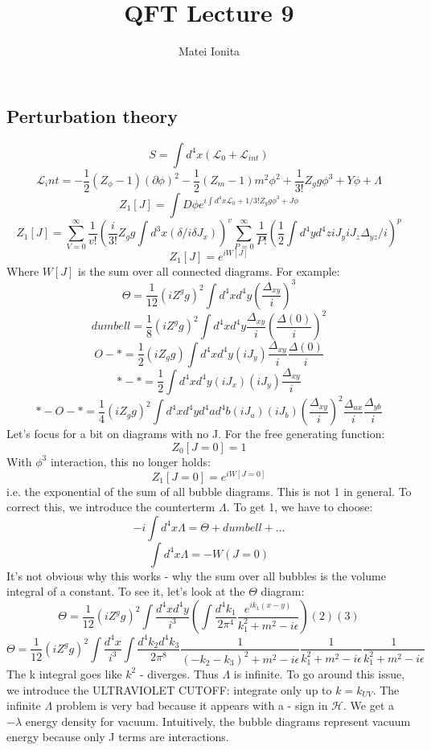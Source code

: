 \documentclass[12 pt]{article}
\title{QFT Lecture 9}
\author{Matei Ionita}
\begin{document}
  \maketitle

\subsection*{Perturbation theory}
\[  S = \int d^4 x (\mathcal{L}_0 + \mathcal{L}_{int} )  \]
\[  \mathcal{L}_int = -\frac{1}{2} (Z_{\phi} -1)(\partial \phi)^2 - \frac{1}{2} (Z_m -1) m^2 \phi^2 + \frac{1}{3!}Z_g g \phi^3 +Y\phi + \Lambda  \]
\[  Z_1[J] = \int D\phi e^{i\int d^4x \mathcal{L}_0 + 1/3! Z_g g \phi^3 + J\phi}  \]
\[  Z_1[J] = \sum_{V=0}^{\infty} \frac{1}{v!} \left(\frac{i}{3!} Z_g g \int d^3 x (\delta/i \delta J_x)\right)^v  \sum_{P=0}^{\infty} \frac{1}{P!} \left( \frac{1}{2} \int d^4 y d^4 z iJ_y iJ_z \Delta_{yz} /i \right) ^p \]
\[ Z_1[J] = e^{iW[J]}  \]
Where $W[J]$ is the sum over all connected diagrams. For example:
\[   \Theta = \frac{1}{12} (iZ^g g)^2 \int d^4x d^4 y \left( \frac{\Delta_{xy}}{i} \right)^3  \]
\[   dumbell = \frac{1}{8} (iZ^g g)^2 \int d^4x d^4 y  \frac{\Delta_{xy}}{i} \left(  \frac{\Delta(0)}{i}  \right) ^2 \]
\[  O-*  = \frac{1}{2} (iZ_g g) \int d^4x d^4 y (iJ_y) \frac{\Delta_{xy}}{i} \frac{\Delta(0)}{i}    \]
\[  *-* = \frac{1}{2} \int d^4x d^4 y (iJ_x)(iJ_y) \frac{\Delta_{xy}}{i}     \]
\[  *-O-* = \frac{1}{4} (iZ_g g)^2 \int d^4x d^4 y d^4 a d^4 b (iJ_a)(iJ_b) \left(  \frac{\Delta_{xy}}{i}   \right)^2 \frac{\Delta_{ax}}{i} \frac{\Delta_{yb}}{i}    \]
Let's focus for a bit on diagrams with no J. For the free generating function:
\[   Z_0[J=0] = 1  \]
With $\phi^3$ interaction, this no longer holds:
\[   Z_1[J=0] = e^{iW[J=0]}   \]
i.e. the exponential of the sum of all bubble diagrams. This is not 1 in general. To correct this, we introduce the counterterm $\Lambda$. To get 1, we have to choose:
\[   -i \int d^4x \Lambda = \Theta + dumbell + ...  \]
\[   \int d^4 x \Lambda = - W(J=0)  \]
It's not obvious why this works - why the sum over all bubbles is the volume integral of a constant. To see it, let's look at the $\Theta$ diagram:
\[   \Theta = \frac{1}{12} (iZ^g g)^2 \int \frac{d^4x d^4 y}{i^3} \left( \int \frac{d^4 k_1}{2\pi^4} \frac{e^{ik_1 (x-y)}}{k_1^2 +m^2 -i\epsilon}  \right) (2)(3)   \]
\[   \Theta = \frac{1}{12} (iZ^g g)^2 \int \frac{d^4x}{i^3} \int \frac{d^4 k_2 d^4 k_3}{2\pi^8} \frac{1}{(-k_2-k_3)^2 +m^2 -i\epsilon}\frac{1}{k_1^2 +m^2 -i\epsilon}\frac{1}{k_1^2 +m^2 -i\epsilon}     \]
The k integral goes like $k^2$ - diverges. Thus $\Lambda$ is infinite. To go around this issue, we introduce the ULTRAVIOLET CUTOFF: integrate only up to $k = k_{UV}$. The infinite $\Lambda$ problem is very bad because it appears with a - sign in $\mathcal{H}$. We get a $-\lambda$ energy density for vacuum. Intuitively, the bubble diagrams represent vacuum energy because only J terms are interactions.
\end{document}
